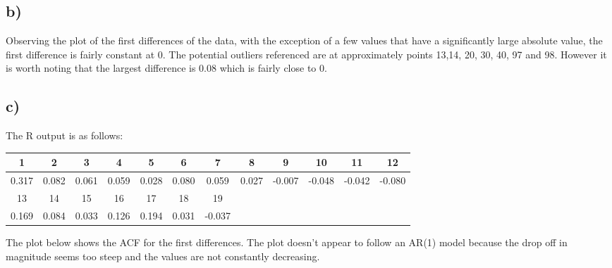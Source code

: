 \documentclass[paper=a4, fontsize=11pt]{scrartcl} %
\numberwithin{equation}{section} %
\numberwithin{figure}{section} %
\numberwithin{table}{section} %
\begin{document}
\subsection*{b)}
Observing the plot of the first differences of the data, with the exception of a few values that have a significantly large absolute value, the first difference is fairly constant at 0. The potential outliers referenced are at approximately points 13,14, 20, 30, 40, 97 and 98. However it is worth noting that the largest difference is 0.08 which is fairly close to 0.


\subsection*{c)}
The R output is as follows:

\begin{tabular}{| c | c | c | c | c | c | c | c | c | c | c | c |}
	\hline
	1 & 2 & 3 & 4 & 5 & 6 & 7 & 8 & 9 & 10 & 11 & 12 \\ \hline
	0.317 & 0.082 & 0.061 & 0.059 & 0.028 & 0.080 & 0.059 & 0.027 & -0.007 & -0.048 & -0.042 & -0.080 \\ \hline
	13 & 14 & 15 & 16 & 17 & 18 & 19 &&&&&\\ \hline
	0.169 & 0.084 & 0.033 & 0.126 & 0.194 & 0.031 & -0.037 &&&&& \\ \hline
\end{tabular}

The plot below shows the ACF for the first differences. The plot doesn't appear to follow an AR(1) model because the drop off in magnitude seems too steep and the values are not constantly decreasing.
\end{document}
